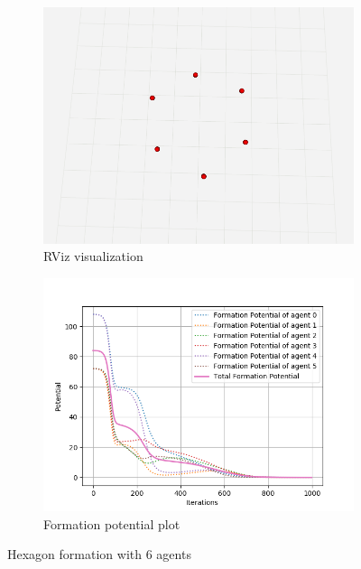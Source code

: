 \documentclass[a4paper,11pt,oneside]{book}
\begin{document}
\begin{figure}
\centering
	\begin{subfigure}{0.49\textwidth}	
	\includegraphics[scale=0.24]{hexagon_rviz}
	\caption{RViz visualization}
	\end{subfigure}
\hfill
	\begin{subfigure}{0.49\textwidth}	
	\includegraphics[scale=0.42]{Formation_potential_hexagon}
	\caption{Formation potential plot}
	\end{subfigure}
\caption{Hexagon formation with $6$ agents}
\label{Hexagon}
\end{figure}
\end{document}
